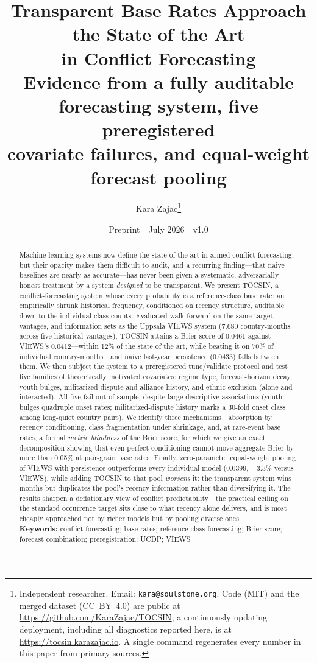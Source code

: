 \documentclass[11pt]{article}
\title{Transparent Base Rates Approach the State of the Art\\in Conflict Forecasting\\[6pt]
\large Evidence from a fully auditable forecasting system, five preregistered\\covariate failures, and equal-weight forecast pooling}
\author{Kara Zajac\thanks{Independent researcher. Email:
\texttt{kara@soulstone.org}. Code (MIT) and the merged dataset (CC~BY~4.0)
are public at \url{https://github.com/KaraZajac/TOCSIN}; a continuously
updating deployment, including all diagnostics reported here, is at
\url{https://tocsin.karazajac.io}. A single command regenerates every number
in this paper from primary sources.}}
\date{Preprint \,\textperiodcentered\, July 2026 \,\textperiodcentered\, v1.0}
\begin{document}
\maketitle

\begin{abstract}
\noindent Machine-learning systems now define the state of the art in
armed-conflict forecasting, but their opacity makes them difficult to audit,
and a recurring finding---that naive baselines are nearly as accurate---has
never been given a systematic, adversarially honest treatment by a system
\emph{designed} to be transparent. We present TOCSIN, a conflict-forecasting
system whose every probability is a reference-class base rate: an empirically
shrunk historical frequency, conditioned on recency structure, auditable down
to the individual class counts. Evaluated walk-forward on the same target,
vantages, and information sets as the Uppsala VIEWS system (7{,}680
country-months across five historical vantages), TOCSIN attains a Brier score
of 0.0461 against VIEWS's 0.0412---within 12\% of the state of the art, while
beating it on 70\% of individual country-months---and naive last-year
persistence (0.0433) falls between them. We then subject the system to a
preregistered tune/validate protocol and test five families of theoretically
motivated covariates: regime type, forecast-horizon decay, youth bulges,
militarized-dispute and alliance history, and ethnic exclusion (alone and
interacted). All five fail out-of-sample, despite large descriptive
associations (youth bulges quadruple onset rates; militarized-dispute history
marks a 30-fold onset class among long-quiet country pairs). We identify
three mechanisms---absorption by recency conditioning, class fragmentation
under shrinkage, and, at rare-event base rates, a formal \emph{metric
blindness} of the Brier score, for which we give an exact decomposition
showing that even perfect conditioning cannot move aggregate Brier by more
than 0.05\% at pair-grain base rates. Finally, zero-parameter equal-weight
pooling of VIEWS with persistence outperforms every individual model (0.0399,
$-3.3\%$ versus VIEWS), while adding TOCSIN to that pool \emph{worsens} it:
the transparent system wins months but duplicates the pool's recency
information rather than diversifying it. The results sharpen a deflationary
view of conflict predictability---the practical ceiling on the standard
occurrence target sits close to what recency alone delivers, and is most
cheaply approached not by richer models but by pooling diverse ones.\\[4pt]
\noindent\textbf{Keywords:} conflict forecasting; base rates;
reference-class forecasting; Brier score; forecast combination;
preregistration; UCDP; VIEWS
\end{abstract}
\end{document}
